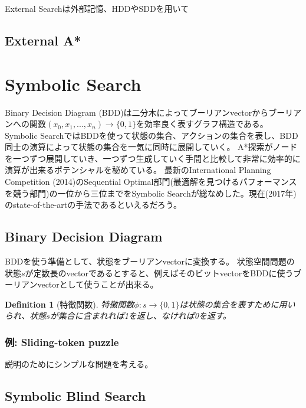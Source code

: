 \documentclass{book}
\newtheorem{definition}{Definition}
\begin{document}
External Searchは外部記憶、HDDやSDDを用いて

\subsection{External A*}


\section{Symbolic Search}

Binary Decision Diagram (BDD)は二分木によってブーリアンvectorからブーリアンへの関数$(x_0,x_1,...,x_n) \rightarrow \{0, 1\}$を効率良く表すグラフ構造である。
Symbolic SearchではBDDを使って状態の集合、アクションの集合を表し、BDD同士の演算によって状態の集合を一気に同時に展開していく。
A*探索がノードを一つずつ展開していき、一つずつ生成していく手間と比較して非常に効率的に演算が出来るポテンシャルを秘めている。
最新のInternational Planning Competition (2014)のSequential Optimal部門(最適解を見つけるパフォーマンスを競う部門)の一位から三位までをSymbolic Searchが総なめした。現在(2017年)のstate-of-the-artの手法であるといえるだろう。

\subsection{Binary Decision Diagram}

BDDを使う準備として、状態をブーリアンvectorに変換する。
状態空間問題の状態$s$が定数長のvectorであるとすると、例えばそのビットvectorをBDDに使うブーリアンvectorとして使うことが出来る。

\begin{definition}[特徴関数]
特徴関数$\phi: s \rightarrow \{0, 1\}$は状態の集合を表すために用いられ、状態$s$が集合に含まれれば1を返し、なければ0を返す。
\end{definition}


\subsubsection{例: Sliding-token puzzle}

説明のためにシンプルな問題を考える。

\begin{figure}
\end{figure}


\subsection{Symbolic Blind Search}
\end{document}
